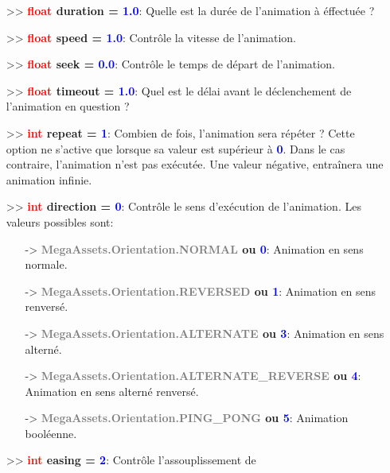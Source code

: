 \documentclass[a4paper, 11pt]{article}
\begin{document}
	\begin{itemize}
		\item[>> \textbf{\textcolor{red}{float} duration = \textcolor{blue}{1.0}}:] Quelle est la durée de 
		l'animation à éffectuée ?\\
		\item[>> \textbf{\textcolor{red}{float} speed = \textcolor{blue}{1.0}}:] Contrôle la vitesse de 
		l'animation.\\
		\item[>> \textbf{\textcolor{red}{float} seek = \textcolor{blue}{0.0}}:] Contrôle le temps de départ
		de l'animation.\\
		\item[>> \textbf{\textcolor{red}{float} timeout = \textcolor{blue}{1.0}}:] Quel est le délai avant 
		le déclenchement de l'animation en question ?\\
		\item[>> \textbf{\textcolor{red}{int} repeat = \textcolor{blue}{1}}:] Combien de fois, l'animation
		sera répéter ? Cette option ne s'active que lorsque sa valeur est supérieur à \textcolor{blue}
		{\textbf{0}}. Dans le cas contraire, l'animation n'est pas exécutée. Une valeur négative, entraînera
		une animation infinie.\\
		\item[>> \textbf{\textcolor{red}{int} direction = \textcolor{blue}{0}}:] Contrôle le sens 
		d'exécution de l'animation. Les valeurs possibles sont:
		\begin{itemize}
			\item[-> \textbf{\textcolor{gray}{MegaAssets.Orientation.NORMAL} ou \textcolor{blue}{0}}:]
			Animation en sens normale.
			\item[-> \textbf{\textcolor{gray}{MegaAssets.Orientation.REVERSED} ou \textcolor{blue}{1}}:]
			Animation en sens renversé.
			\item[-> \textbf{\textcolor{gray}{MegaAssets.Orientation.ALTERNATE} ou \textcolor{blue}{3}}:]
			Animation en sens alterné.
			\item[-> \textbf{\textcolor{gray}{MegaAssets.Orientation.ALTERNATE\_REVERSE} ou \textcolor{blue}
			{4}}:] Animation en sens alterné renversé.
			\item[-> \textbf{\textcolor{gray}{MegaAssets.Orientation.PING\_PONG} ou \textcolor{blue}{5}}:]
			Animation booléenne.\\
		\end{itemize}
		\item[>> \textbf{\textcolor{red}{int} easing = \textcolor{blue}{2}}:] Contrôle l'assouplissement de

\end{itemize}
\end{document}
